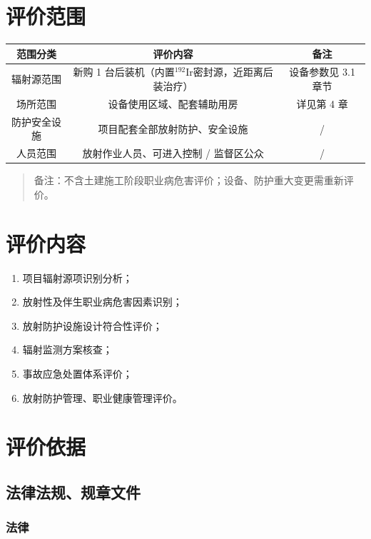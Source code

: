 \section{评价范围}

\begin{table}[H]
\centering
\begin{tabular}{|c|c|c|}
\hline
范围分类 & 评价内容 & 备注 \\
\hline
辐射源范围 & 新购 1 台后装机（内置$^{192}\text{Ir}$密封源，近距离后装治疗） & 设备参数见 3.1 章节 \\
\hline
场所范围 & 设备使用区域、配套辅助用房 & 详见第 4 章 \\
\hline
防护安全设施 & 项目配套全部放射防护、安全设施 & / \\
\hline
人员范围 & 放射作业人员、可进入控制 / 监督区公众 & / \\
\hline
\end{tabular}
\end{table}


\begin{quote}
备注：不含土建施工阶段职业病危害评价；设备、防护重大变更需重新评价。
\end{quote}

\section{评价内容}

\begin{enumerate}
\item 项目辐射源项识别分析；
\item 放射性及伴生职业病危害因素识别；
\item 放射防护设施设计符合性评价；
\item 辐射监测方案核查；
\item 事故应急处置体系评价；
\item 放射防护管理、职业健康管理评价。
\end{enumerate}

\section{评价依据}

\subsection{法律法规、规章文件}

\subsubsection{法律}

